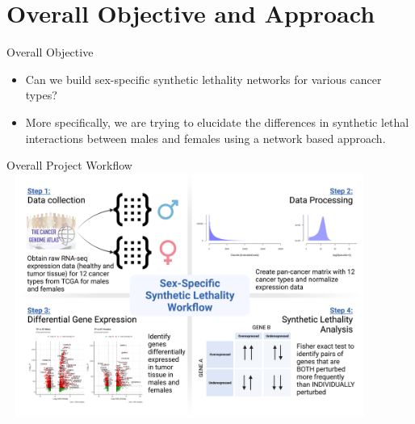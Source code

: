 \documentclass{beamer}
\begin{document}
	\section{Overall Objective and Approach}
	\begin{frame}{Overall Objective}
		\begin{itemize}
			\item Can we build sex-specific synthetic lethality networks for various cancer types? \newline
			
			\item More specifically, we are trying to elucidate the differences in synthetic lethal interactions between males and females using a network based approach.
		\end{itemize}
	\end{frame}

	
	\begin{frame}{Overall Project Workflow}
		\includegraphics[width=12cm, height=8cm]{project_workflow_slpmcrc_2.png}
	\end{frame}
\end{document}
